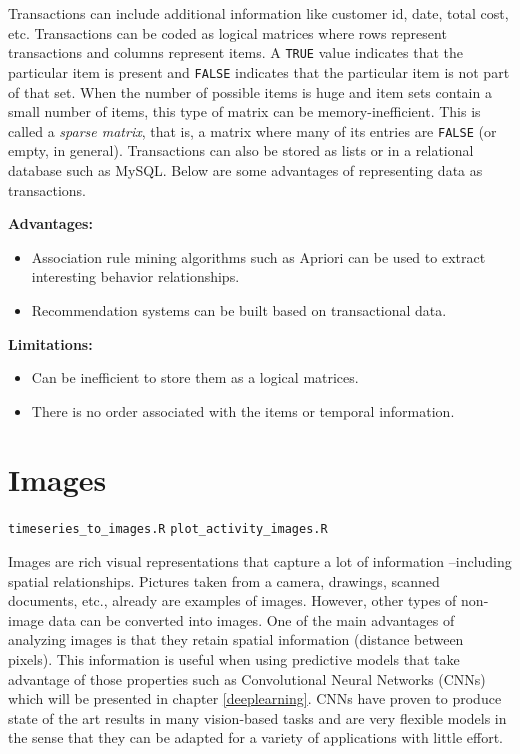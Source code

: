 \documentclass[
  11pt,
]{krantz}
\makeatletter
\providecommand{\tightlist}{%
  \setlength{\itemsep}{0pt}\setlength{\parskip}{0pt}}
\newenvironment{kframe}{%
\medskip{}
\setlength{\fboxsep}{.8em}
 \def\at@end@of@kframe{}%
 \ifinner\ifhmode%
  \def\at@end@of@kframe{\end{minipage}}%
  \begin{minipage}{\columnwidth}%
 \fi\fi%
 \def\FrameCommand##1{\hskip\@totalleftmargin \hskip-\fboxsep
 \colorbox{shadecolor}{##1}\hskip-\fboxsep
     \hskip-\linewidth \hskip-\@totalleftmargin \hskip\columnwidth}%
 \MakeFramed {\advance\hsize-\width
   \@totalleftmargin\z@ \linewidth\hsize
   \@setminipage}}%
 {\par\unskip\endMakeFramed%
 \at@end@of@kframe}
\newenvironment{rmdblock}[1]
  {
  \begin{itemize}
  \renewcommand{\labelitemi}{
    \raisebox{-.7\height}[0pt][0pt]{
      {\setkeys{Gin}{width=3em,keepaspectratio}\texttt{[image: images/icons/\#1]}}
    }
  }
  \setlength{\fboxsep}{1em}
  \begin{kframe}
  \item
  }
  {
  \end{kframe}
  \end{itemize}
  }
\newenvironment{rmdfolder}
  {\begin{rmdblock}{folder}}
  {\end{rmdblock}}
\makeatother
\begin{document}
Transactions can include additional information like customer id, date, total cost, etc. Transactions can be coded as logical matrices where rows represent transactions and columns represent items. A \texttt{TRUE} value indicates that the particular item is present and \texttt{FALSE} indicates that the particular item is not part of that set. When the number of possible items is huge and item sets contain a small number of items, this type of matrix can be memory-inefficient. This is called a \emph{sparse matrix}, that is, a matrix where many of its entries are \texttt{FALSE} (or empty, in general). Transactions can also be stored as lists or in a relational database such as MySQL. Below are some advantages of representing data as transactions.

\textbf{Advantages:}

\begin{itemize}
\item
  Association rule mining algorithms such as Apriori can be used to extract interesting behavior relationships.
\item
  Recommendation systems can be built based on transactional data.
\end{itemize}

\textbf{Limitations:}

\begin{itemize}
\tightlist
\item
  Can be inefficient to store them as a logical matrices.
\item
  There is no order associated with the items or temporal information.
\end{itemize}

\hypertarget{images}{%
\section{Images}\label{images}}

\begin{rmdfolder}
\texttt{timeseries\_to\_images.R} \texttt{plot\_activity\_images.R}
\end{rmdfolder}

Images are rich visual representations that capture a lot of information --including spatial relationships. Pictures taken from a camera, drawings, scanned documents, etc., already are examples of images. However, other types of non-image data can be converted into images. One of the main advantages of analyzing images is that they retain spatial information (distance between pixels). This information is useful when using predictive models that take advantage of those properties such as Convolutional Neural Networks (CNNs) which will be presented in chapter \ref{deeplearning}. CNNs have proven to produce state of the art results in many vision-based tasks and are very flexible models in the sense that they can be adapted for a variety of applications with little effort.
\end{document}
